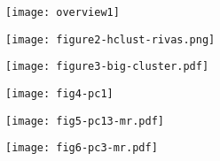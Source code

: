 \documentclass[11pt]{article}
\begin{document}
\begin{figure}
  \centering
  \texttt{[image: overview1]}
  \caption{}
  \label{fig:1}
\end{figure}

\begin{figure}
  \centering
  \texttt{[image: figure2-hclust-rivas.png]}
  \caption{}
  \label{fig:2}
\end{figure}

\begin{figure}
  \centering
  \texttt{[image: figure3-big-cluster.pdf]}
  \caption{}
  \label{fig:3}
\end{figure}

\begin{figure}
  \centering
  \texttt{[image: fig4-pc1]}
  \caption{}
  \label{fig:4}
\end{figure}


\begin{figure}
  \centering
  \texttt{[image: fig5-pc13-mr.pdf]}
  \caption{}
  \label{fig:4}
\end{figure}

\begin{figure}
  \centering
  \texttt{[image: fig6-pc3-mr.pdf]}
  \caption{}
  \label{fig:4}
\end{figure}
\end{document}
